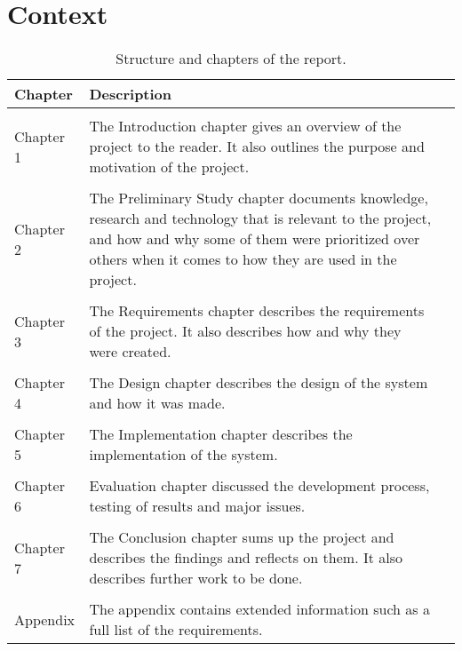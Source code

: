 \section{Context}
\begin{table}
\centering
\begin{tabularx}{\textwidth}{ l X l }
  \textbf{Chapter}      & \textbf{Description} \\
  \hline \\ [-1.5ex]
  Chapter 1 & The Introduction chapter gives an overview of the project to the reader. It also outlines the purpose and motivation of the project. \\
  \hline \\ [-1.5ex]
  Chapter 2 & The Preliminary Study chapter documents knowledge, research and technology that is relevant to the project, and how and why some of them were prioritized over others when it comes to how they are used in the project. \\
  \hline \\ [-1.5ex]
  Chapter 3 & The Requirements chapter describes the requirements of the project. It also describes how and why they were created. \\
  \hline \\ [-1.5ex]
  Chapter 4 & The Design chapter describes the design of the system and how it was made. \\
  \hline \\ [-1.5ex]
  Chapter 5 & The Implementation chapter describes the implementation of the system. \\
  \hline \\ [-1.5ex]
  Chapter 6 & Evaluation chapter discussed the development process, testing of results and major issues. \\
  \hline \\ [-1.5ex]
  Chapter 7 & The Conclusion chapter sums up the project and describes the findings and reflects on them. It also describes further work to be done. \\
  \hline \\ [-1.5ex]
  Appendix & The appendix contains extended information such as a full list of the requirements. \\
\end{tabularx}
\caption{Structure and chapters of the report.}
\label{table-reportstructure}
\end{table}
